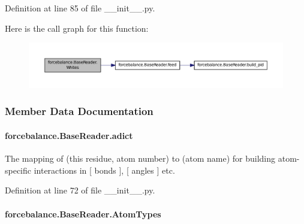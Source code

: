 Definition at line 85 of file \-\_\-\-\_\-init\-\_\-\-\_\-.\-py.



Here is the call graph for this function\-:\nopagebreak
\begin{figure}[H]
\begin{center}
\leavevmode
\includegraphics[width=350pt]{classforcebalance_1_1BaseReader_af2af8a559625614474a1c6fe245b5e13_cgraph}
\end{center}
\end{figure}




\subsubsection{Member Data Documentation}
\hypertarget{classforcebalance_1_1BaseReader_a2c46ad6b66cf09a30e917ce4a1997e2a}{
\paragraph[{adict}]{\setlength{\rightskip}{0pt plus 5cm}forcebalance.\-Base\-Reader.\-adict\hspace{0.3cm}{\ttfamily [inherited]}}}\label{classforcebalance_1_1BaseReader_a2c46ad6b66cf09a30e917ce4a1997e2a}


The mapping of (this residue, atom number) to (atom name) for building atom-\/specific interactions in \mbox{[} bonds \mbox{]}, \mbox{[} angles \mbox{]} etc. 



Definition at line 72 of file \-\_\-\-\_\-init\-\_\-\-\_\-.\-py.

\hypertarget{classforcebalance_1_1BaseReader_a69ca7d949a4a3df4d9f61e617fe0e270}{
\paragraph[{Atom\-Types}]{\setlength{\rightskip}{0pt plus 5cm}forcebalance.\-Base\-Reader.\-Atom\-Types\hspace{0.3cm}{\ttfamily [inherited]}}}\label{classforcebalance_1_1BaseReader_a69ca7d949a4a3df4d9f61e617fe0e270}


